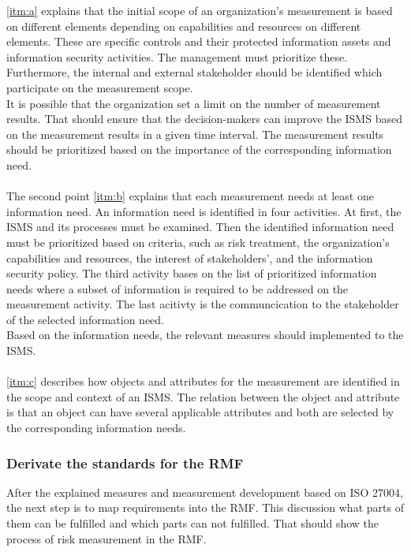 \ref{itm:a} explains that the initial scope of an organization's measurement is based on different elements depending on capabilities and resources on different elements. These are specific controls and their protected information assets  and information security activities. The management must prioritize these. Furthermore, the internal and external stakeholder should be identified which participate on the measurement scope. \\
It is possible that the organization set a limit on the number of measurement results. That should ensure that the decision-makers can improve the ISMS based on the measurement results in a given time interval. The measurement results should be prioritized based on the importance of the corresponding information need. \\ \\
The second point \ref{itm:b} explains that each measurement needs at least one information need. An information need is identified in four activities. At first, the ISMS and its processes must be examined. Then the identified information need must be prioritized based on criteria, such as risk treatment, the organization's capabilities and resources, the interest of stakeholders', and the information security policy. The third activity bases on the list of prioritized information needs where a subset of information is required to be addressed on the measurement activity. The last acitivty is the communcication to the stakeholder of the selected information need. \\
Based on the information needs, the relevant measures should implemented to the ISMS. \\ \\
\ref{itm:c} describes how objects and attributes for the measurement are identified in the scope and context of an ISMS. The relation between the object and attribute is that an object can have several applicable attributes and both are selected by the corresponding information needs. \\

\subsubsection*{Derivate the standards for the RMF}

After the explained measures and measurement development based on ISO 27004, the next step is to map requirements into the RMF. This discussion what parts of them can be fulfilled and which parts can not fulfilled. That should show the process of risk measurement in the RMF.

